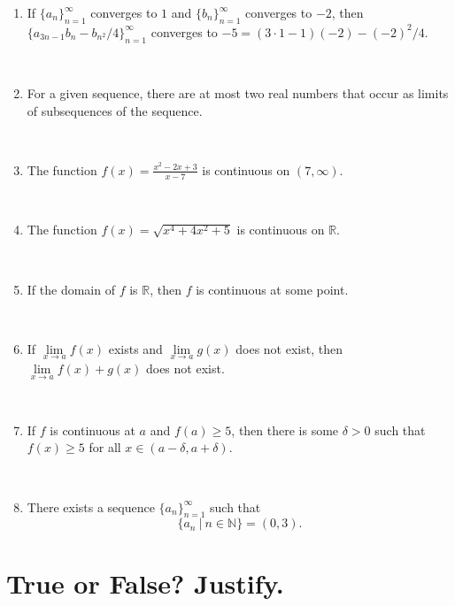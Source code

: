 \documentclass[12pt]{amsart}
\newcommand{\R}{{\mathbb{R}}}
\newcommand{\N}{\mathbb{N}}
\numberwithin{equation}{section}
\theoremstyle{plain} %
\theoremstyle{definition}
\theoremstyle{remark}
\begin{document}
\begin{enumerate}
 
	 
	
	 \
	 
	 	\item  If $\{a_n\}_{n=1}^\infty$ converges to $1$ and $\{b_n\}_{n=1}^\infty$ converges to $-2$, then ${\{a_{3n-1} b_{n} - b_{n^2}/4\}_{n=1}^{\infty}}$ converges to $-5 = (3\cdot 1 - 1)(-2) - (-2)^2/4$. 
		
\

 \item  For a given sequence, there are at most two real numbers that occur as limits of subsequences of the sequence.
 
 \

 	 \item  The function $\displaystyle f(x) = \frac{x^2 - 2x + 3}{x-7}$ is continuous on $(7,\infty)$.
	 
	 \
	
	 \item  The function $f(x) = \sqrt{ x^4 + 4x^2 +5}$ is continuous on $\R$.
	 
	 \
	 
	 	 \item  If the domain of $f$ is $\R$, then $f$ is continuous at some point.
	 
	 \	
	 
	 		\item If $\lim\limits_{x\to a} f(x)$ exists and $\lim\limits_{x\to a} g(x)$ does not exist, then $\lim\limits_{x\to a} f(x) + g(x)$ does not exist.
	
	\
	 
	 	 \item  If $f$ is continuous at $a$ and $f(a) \geq 5$, then there is some $\delta>0$ such that $f(x)\geq 5 $ for all $x\in (a-\delta,a+\delta)$.
	 
	 \
	 
	 
	 
	 	 \item There exists a sequence $\{a_n\}_{n=1}^\infty$ such that 
	 \[ \{ a_n \ | \ n\in \N \} = (0,3).\]
	 
	 

		\end{enumerate}
		
		
		
		\newpage
		
		\thispagestyle{empty}
		\section*{\large True or False? Justify.}
\end{document}
